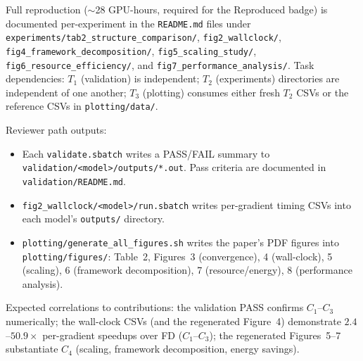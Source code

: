 \documentclass[nonacm,sigconf]{acmart}
\begin{document}
\noindent
Full reproduction ($\sim$28 GPU-hours, required for the Reproduced
badge) is documented per-experiment in the \texttt{README.md} files
under \texttt{experiments/tab2\_structure\_comparison/},
\texttt{fig2\_wallclock/}, \texttt{fig4\_framework\_decomposition/},
\texttt{fig5\_scaling\_study/}, \texttt{fig6\_resource\_efficiency/},
and \texttt{fig7\_performance\_analysis/}.
Task dependencies: $T_1$ (validation) is independent; $T_2$
(experiments) directories are independent of one another; $T_3$
(plotting) consumes either fresh $T_2$ CSVs or the reference CSVs
in \texttt{plotting/data/}.

\artout

Reviewer path outputs:
\begin{itemize}
  \item Each \texttt{validate.sbatch} writes a PASS/FAIL summary to
    \texttt{validation/<model>/outputs/*.out}. Pass criteria are
    documented in \texttt{validation/README.md}.
  \item \texttt{fig2\_wallclock/<model>/run.sbatch} writes
    per-gradient timing CSVs into each model's \texttt{outputs/}
    directory.
  \item \texttt{plotting/generate\_all\_figures.sh} writes the
    paper's PDF figures into \texttt{plotting/figures/}: Table~2,
    Figures~3 (convergence), 4 (wall-clock), 5 (scaling),
    6 (framework decomposition), 7 (resource/energy),
    8 (performance analysis).
\end{itemize}

\noindent
Expected correlations to contributions:
the validation PASS confirms $C_1$--$C_3$ numerically;
the wall-clock CSVs (and the regenerated Figure~4) demonstrate
$2.4$--$50.9\times$ per-gradient speedups over FD ($C_1$--$C_3$);
the regenerated Figures~5--7 substantiate $C_4$ (scaling,
framework decomposition, energy savings).
\end{document}
